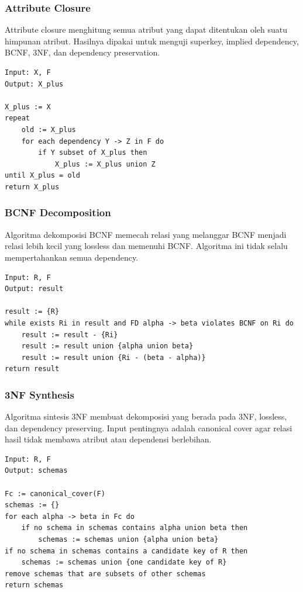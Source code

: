 \subsubsection{Attribute Closure}

\begin{jawab}
Attribute closure menghitung semua atribut yang dapat ditentukan oleh suatu himpunan atribut. Hasilnya dipakai untuk menguji superkey, implied dependency, BCNF, 3NF, dan dependency preservation.
\end{jawab}

\begin{lstlisting}[caption={Pseudocode attribute closure}, label={lst:attribute-closure-final}]
Input: X, F
Output: X_plus

X_plus := X
repeat
    old := X_plus
    for each dependency Y -> Z in F do
        if Y subset of X_plus then
            X_plus := X_plus union Z
until X_plus = old
return X_plus
\end{lstlisting}

\subsubsection{BCNF Decomposition}

\begin{jawab}
Algoritma dekomposisi BCNF memecah relasi yang melanggar BCNF menjadi relasi lebih kecil yang lossless dan memenuhi BCNF. Algoritma ini tidak selalu mempertahankan semua dependency.
\end{jawab}

\begin{lstlisting}[caption={Pseudocode dekomposisi BCNF}, label={lst:bcnf-final}]
Input: R, F
Output: result

result := {R}
while exists Ri in result and FD alpha -> beta violates BCNF on Ri do
    result := result - {Ri}
    result := result union {alpha union beta}
    result := result union {Ri - (beta - alpha)}
return result
\end{lstlisting}

\subsubsection{3NF Synthesis}

\begin{jawab}
Algoritma sintesis 3NF membuat dekomposisi yang berada pada 3NF, lossless, dan dependency preserving. Input pentingnya adalah canonical cover agar relasi hasil tidak membawa atribut atau dependensi berlebihan.
\end{jawab}

\begin{lstlisting}[caption={Pseudocode sintesis 3NF}, label={lst:3nf-final}]
Input: R, F
Output: schemas

Fc := canonical_cover(F)
schemas := {}
for each alpha -> beta in Fc do
    if no schema in schemas contains alpha union beta then
        schemas := schemas union {alpha union beta}
if no schema in schemas contains a candidate key of R then
    schemas := schemas union {one candidate key of R}
remove schemas that are subsets of other schemas
return schemas
\end{lstlisting}
